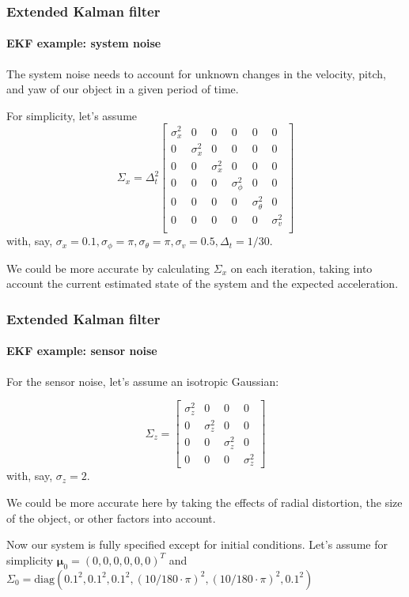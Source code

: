 \documentclass[aspectratio=169]{beamer}
\renewcommand{\vec}[1]{\boldsymbol{#1}}
\begin{document}
\begin{frame}
\frametitle{Extended Kalman filter}
\framesubtitle{EKF example: system noise}

The system noise needs to account for unknown changes in the velocity,
pitch, and yaw of our object in a given period of time.

For simplicity, let's assume
\begin{equation*}
 \Sigma_x = \Delta_t^2 \begin{bmatrix}
   \sigma_x^2 & 0   & 0   & 0   & 0   & 0   \\
   0   & \sigma_x^2 & 0   & 0   & 0   & 0   \\
   0   & 0   & \sigma_x^2 & 0   & 0   & 0   \\
   0   & 0   & 0   & \sigma_{\phi}^2 & 0   & 0   \\
   0   & 0   & 0   & 0   & \sigma_{\theta}^2 & 0   \\
   0   & 0   & 0   & 0   & 0   & \sigma_v^2 \\
\end{bmatrix}
\end{equation*}
with, say, $\sigma_x = 0.1, \sigma_{\phi} = \pi, \sigma_{\theta} =
\pi, \sigma_v = 0.5, \Delta_t = 1/30$.

\medskip
We could be more accurate by calculating $\Sigma_x$ on each iteration,
taking into account the current estimated state of the system and the
expected acceleration.

\end{frame}

\begin{frame}
\frametitle{Extended Kalman filter}
\framesubtitle{EKF example: sensor noise}

For the sensor noise, let's assume an isotropic Gaussian:

\begin{equation*}
 \Sigma_z = \begin{bmatrix}
\sigma_z^2 & 0 & 0 & 0 \\
0 & \sigma_z^2 & 0 & 0 \\
0 & 0 & \sigma_z^2 & 0 \\
0 & 0 & 0 & \sigma_z^2
\end{bmatrix}
\end{equation*}
with, say, $\sigma_z = 2$.

\medskip
We could be more accurate here by taking the effects of radial
distortion, the size of the object, or other factors into account.

\medskip
Now our system is fully specified except for initial conditions.
Let's assume for simplicity $\vec{\mu}_0 = ( 0, 0, 0, 0, 0, 0 )^T$ and
$\Sigma_0 = \mbox{diag}( 0.1^2, 0.1^2, 0.1^2, (10/180 \cdot \pi)^2,
(10/180 \cdot \pi)^2, 0.1^2 )$

\end{frame}
\end{document}
